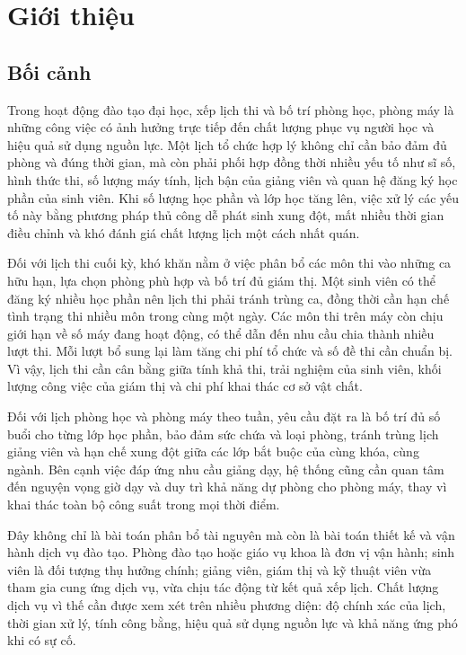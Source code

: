 
\chapter{Giới thiệu}
\label{ch:gioi-thieu}

\section{Bối cảnh}
\label{sec:boi-canh}

Trong hoạt động đào tạo đại học, xếp lịch thi và bố trí phòng học, phòng máy là những công việc có ảnh hưởng trực tiếp đến chất lượng phục vụ người học và hiệu quả sử dụng nguồn lực. Một lịch tổ chức hợp lý không chỉ cần bảo đảm đủ phòng và đúng thời gian, mà còn phải phối hợp đồng thời nhiều yếu tố như sĩ số, hình thức thi, số lượng máy tính, lịch bận của giảng viên và quan hệ đăng ký học phần của sinh viên. Khi số lượng học phần và lớp học tăng lên, việc xử lý các yếu tố này bằng phương pháp thủ công dễ phát sinh xung đột, mất nhiều thời gian điều chỉnh và khó đánh giá chất lượng lịch một cách nhất quán.

Đối với lịch thi cuối kỳ, khó khăn nằm ở việc phân bổ các môn thi vào những ca hữu hạn, lựa chọn phòng phù hợp và bố trí đủ giám thị. Một sinh viên có thể đăng ký nhiều học phần nên lịch thi phải tránh trùng ca, đồng thời cần hạn chế tình trạng thi nhiều môn trong cùng một ngày. Các môn thi trên máy còn chịu giới hạn về số máy đang hoạt động, có thể dẫn đến nhu cầu chia thành nhiều lượt thi. Mỗi lượt bổ sung lại làm tăng chi phí tổ chức và số đề thi cần chuẩn bị. Vì vậy, lịch thi cần cân bằng giữa tính khả thi, trải nghiệm của sinh viên, khối lượng công việc của giám thị và chi phí khai thác cơ sở vật chất.

Đối với lịch phòng học và phòng máy theo tuần, yêu cầu đặt ra là bố trí đủ số buổi cho từng lớp học phần, bảo đảm sức chứa và loại phòng, tránh trùng lịch giảng viên và hạn chế xung đột giữa các lớp bắt buộc của cùng khóa, cùng ngành. Bên cạnh việc đáp ứng nhu cầu giảng dạy, hệ thống cũng cần quan tâm đến nguyện vọng giờ dạy và duy trì khả năng dự phòng cho phòng máy, thay vì khai thác toàn bộ công suất trong mọi thời điểm.

Đây không chỉ là bài toán phân bổ tài nguyên mà còn là bài toán thiết kế và vận hành dịch vụ đào tạo. Phòng đào tạo hoặc giáo vụ khoa là đơn vị vận hành; sinh viên là đối tượng thụ hưởng chính; giảng viên, giám thị và kỹ thuật viên vừa tham gia cung ứng dịch vụ, vừa chịu tác động từ kết quả xếp lịch. Chất lượng dịch vụ vì thế cần được xem xét trên nhiều phương diện: độ chính xác của lịch, thời gian xử lý, tính công bằng, hiệu quả sử dụng nguồn lực và khả năng ứng phó khi có sự cố.

